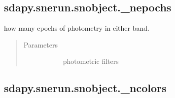 \documentclass[letterpaper,10pt,english]{sphinxmanual}
\begin{document}
\subsection{sdapy.snerun.snobject.\_nepochs}
\label{\detokenize{generated/sdapy.snerun.snobject._nepochs:sdapy-snerun-snobject-nepochs}}\label{\detokenize{generated/sdapy.snerun.snobject._nepochs::doc}}

\begin{fulllineitems}
\label{\detokenize{generated/sdapy.snerun.snobject._nepochs:sdapy.snerun.snobject._nepochs}}
how many epochs of photometry in either band.
\begin{quote}\begin{description}
\item[{Parameters}] \leavevmode\begin{description}
\item[{}] \leavevmode{[}\sphinxtitleref{list}{]}
photometric filters

\end{description}

\end{description}\end{quote}

\end{fulllineitems}



\subsection{sdapy.snerun.snobject.\_ncolors}
\label{\detokenize{generated/sdapy.snerun.snobject._ncolors:sdapy-snerun-snobject-ncolors}}\label{\detokenize{generated/sdapy.snerun.snobject._ncolors::doc}}
\end{document}
